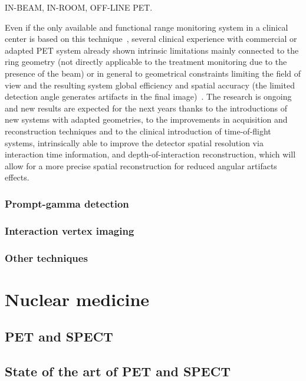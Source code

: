 IN-BEAM, IN-ROOM, OFF-LINE PET. 

Even if the only available and functional range monitoring system in a clinical center is based on this technique~\parencite{Enghardt2004}, several clinical experience with commercial or adapted PET system already shown intrinsic limitations mainly connected to the ring geometry (not directly applicable to the treatment monitoring due to the presence of the beam) or in general to geometrical constraints limiting the field of view and the resulting system global efficiency and spatial accuracy (the limited detection angle generates artifacts in the final image)~\parencite{Parodi2016}. The research is ongoing and new results are expected for the next years thanks to the introductions of new systems with adapted geometries, to the improvements in acquisition and reconstruction techniques and to the clinical introduction of time-of-flight systems, intrinsically able to improve the detector spatial resolution via interaction time information, and depth-of-interaction reconstruction, which will allow for a more precise spatial reconstruction for reduced angular artifacts effects.

\subsubsection{Prompt-gamma detection}\label{chap1::subsec::PGgeneral}

\subsubsection{Interaction vertex imaging}\label{chap1::subsec::IVI}

\subsubsection{Other techniques}\label{chap1::subsec::rangeComplTechniques}




\section{Nuclear medicine}\label{chap1::sec::NuclearMed}


\subsection{PET and SPECT}\label{chap1::subsec::PET-SPECT}


\subsection{State of the art of PET and SPECT}


\clearpage
